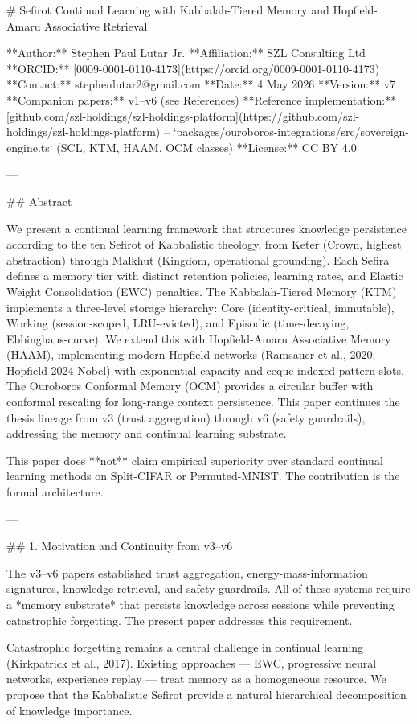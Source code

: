 # Sefirot Continual Learning with Kabbalah-Tiered Memory and Hopfield-Amaru Associative Retrieval

**Author:** Stephen Paul Lutar Jr.
**Affiliation:** SZL Consulting Ltd
**ORCID:** [0009-0001-0110-4173](https://orcid.org/0009-0001-0110-4173)
**Contact:** stephenlutar2@gmail.com
**Date:** 4 May 2026
**Version:** v7
**Companion papers:** v1--v6 (see References)
**Reference implementation:** [github.com/szl-holdings/szl-holdings-platform](https://github.com/szl-holdings/szl-holdings-platform) -- `packages/ouroboros-integrations/src/sovereign-engine.ts` (SCL, KTM, HAAM, OCM classes)
**License:** CC BY 4.0

---

## Abstract

We present a continual learning framework that structures knowledge persistence according to the ten Sefirot of Kabbalistic theology, from Keter (Crown, highest abstraction) through Malkhut (Kingdom, operational grounding). Each Sefira defines a memory tier with distinct retention policies, learning rates, and Elastic Weight Consolidation (EWC) penalties. The Kabbalah-Tiered Memory (KTM) implements a three-level storage hierarchy: Core (identity-critical, immutable), Working (session-scoped, LRU-evicted), and Episodic (time-decaying, Ebbinghaus-curve). We extend this with Hopfield-Amaru Associative Memory (HAAM), implementing modern Hopfield networks (Ramsauer et al., 2020; Hopfield 2024 Nobel) with exponential capacity and ceque-indexed pattern slots. The Ouroboros Conformal Memory (OCM) provides a circular buffer with conformal rescaling for long-range context persistence. This paper continues the thesis lineage from v3 (trust aggregation) through v6 (safety guardrails), addressing the memory and continual learning substrate.

This paper does **not** claim empirical superiority over standard continual learning methods on Split-CIFAR or Permuted-MNIST. The contribution is the formal architecture.

---

## 1. Motivation and Continuity from v3--v6

The v3--v6 papers established trust aggregation, energy-mass-information signatures, knowledge retrieval, and safety guardrails. All of these systems require a *memory substrate* that persists knowledge across sessions while preventing catastrophic forgetting. The present paper addresses this requirement.

Catastrophic forgetting remains a central challenge in continual learning (Kirkpatrick et al., 2017). Existing approaches --- EWC, progressive neural networks, experience replay --- treat memory as a homogeneous resource. We propose that the Kabbalistic Sefirot provide a natural hierarchical decomposition of knowledge importance.

